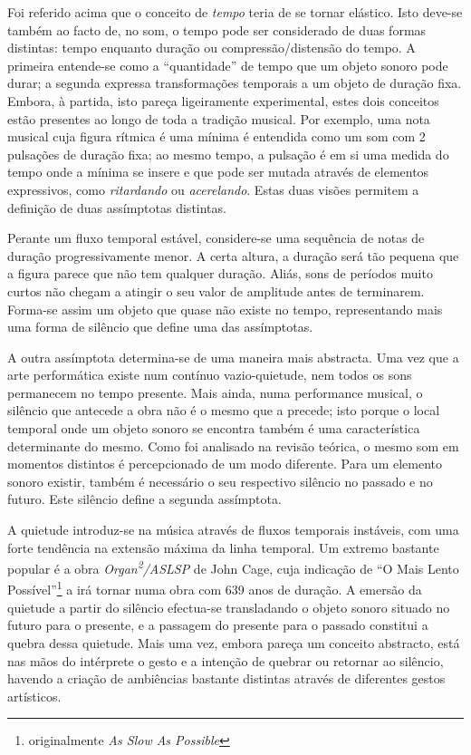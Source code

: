 \documentclass[../main.tex]{subfiles}
\begin{document}

Foi referido acima que o conceito de \textsl{tempo} teria de se tornar elástico. Isto deve-se também ao facto de, no som, o tempo pode ser considerado de duas formas distintas: tempo enquanto duração ou compressão/distensão do tempo. A primeira entende-se como a \enquote{quantidade} de tempo que um objeto sonoro pode durar; a segunda expressa transformações temporais a um objeto de duração fixa. Embora, à partida, isto pareça ligeiramente experimental, estes dois conceitos estão presentes ao longo de toda a tradição musical. Por exemplo, uma nota musical cuja figura rítmica é uma mínima é entendida como um som com 2 pulsações de duração fixa; ao mesmo tempo, a pulsação é em si uma medida do tempo onde a mínima se insere e que pode ser mutada através de elementos expressivos, como \textsl{ritardando} ou \textsl{acerelando}. Estas duas visões permitem a definição de duas assímptotas distintas.

Perante um fluxo temporal estável, considere-se uma sequência de notas de duração progressivamente menor. A certa altura, a duração será tão pequena que a figura parece que não tem qualquer duração. Aliás, sons de períodos muito curtos não chegam a atingir o seu valor de amplitude antes de terminarem\cite{olson}. Forma-se assim um objeto que quase não existe no tempo, representando mais uma forma de silêncio que define uma das assímptotas.

A outra assímptota determina-se de uma maneira mais abstracta. Uma vez que a arte performática existe num contínuo vazio-quietude, nem todos os sons permanecem no tempo presente. Mais ainda, numa performance musical, o silêncio que antecede a obra não é o mesmo que a precede; isto porque o local temporal onde um objeto sonoro se encontra também é uma característica determinante do mesmo. Como foi analisado na revisão teórica, o mesmo som em momentos distintos é percepcionado de um modo diferente\cite{gadamer}. Para um elemento sonoro existir, também é necessário o seu respectivo silêncio no passado e no futuro. Este silêncio define a segunda assímptota.

A quietude introduz-se na música através de fluxos temporais instáveis, com uma forte tendência na extensão máxima da linha temporal. Um extremo bastante popular é a obra \textsl{Organ\textsuperscript{2}/ASLSP} de John Cage, cuja indicação de \enquote{O Mais Lento Possível}\footnote{originalmente \textsl{As Slow As Possible}} a irá tornar numa obra com 639 anos de duração\cite{aslsp}. A emersão da quietude a partir do silêncio efectua-se transladando o objeto sonoro situado no futuro para o presente, e a passagem do presente para o passado constitui a quebra dessa quietude. Mais uma vez, embora pareça um conceito abstracto, está nas mãos do intérprete o gesto e a intenção de quebrar ou retornar ao silêncio, havendo a criação de ambiências bastante distintas através de diferentes gestos artísticos.
\end{document}
